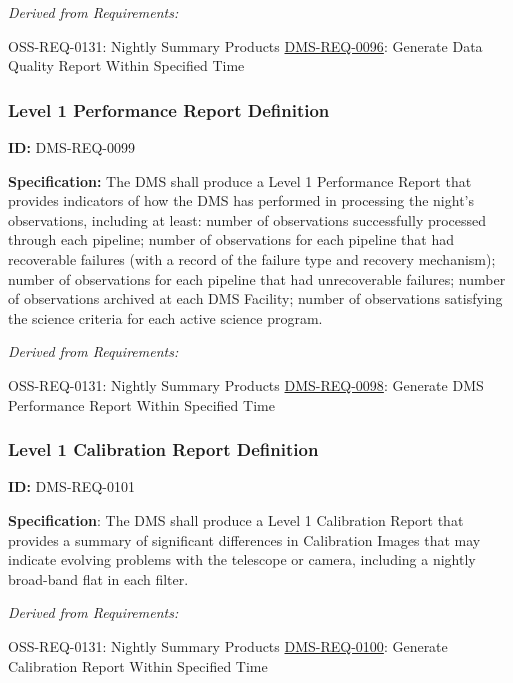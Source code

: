 \documentclass[SE,toc,lsstdraft]{lsstdoc}
\begin{document}
\emph{Derived from Requirements:}

OSS-REQ-0131:
Nightly Summary Products \newline
\hyperref[DMS-REQ-0096]{DMS-REQ-0096}:
Generate Data Quality Report Within Specified Time \newline


\subsubsection{Level 1 Performance Report Definition}

\label{DMS-REQ-0099}
\textbf{ID:} DMS-REQ-0099

\textbf{Specification:} The DMS shall produce a Level 1 Performance Report that provides indicators of how the DMS has performed in processing the night's observations, including at least: number of observations successfully processed through each pipeline; number of observations for each pipeline that had recoverable failures (with a record of the failure type and recovery mechanism); number of observations for each pipeline that had unrecoverable failures; number of observations archived at each DMS Facility; number of observations satisfying the science criteria for each active science program.






\emph{Derived from Requirements:}

OSS-REQ-0131:
Nightly Summary Products \newline
\hyperref[DMS-REQ-0098]{DMS-REQ-0098}:
Generate DMS Performance Report Within Specified Time \newline


\subsubsection{Level 1 Calibration Report Definition}

\label{DMS-REQ-0101}
\textbf{ID:} DMS-REQ-0101

\textbf{Specification}: The DMS shall produce a Level 1 Calibration Report that provides a summary of significant differences in Calibration Images that may indicate evolving problems with the telescope or camera, including a nightly broad-band flat in each filter.






\emph{Derived from Requirements:}

OSS-REQ-0131:
Nightly Summary Products \newline
\hyperref[DMS-REQ-0100]{DMS-REQ-0100}:
Generate Calibration Report Within Specified Time \newline
\end{document}
